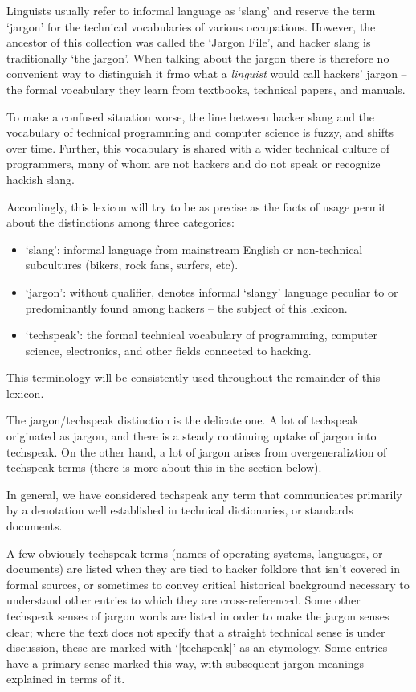 Linguists usually refer to informal language as `slang' and reserve the term
`jargon' for the technical vocabularies of various occupations. However, the
ancestor of this collection was called the `Jargon File', and hacker slang is
traditionally `the jargon'. When talking about the jargon there is therefore no
convenient way to distinguish it frmo what a \textit{linguist} would call
hackers' jargon -- the formal vocabulary they learn from textbooks, technical
papers, and manuals.

To make a confused situation worse, the line between hacker slang and the
vocabulary of technical programming and computer science is fuzzy, and shifts
over time. Further, this vocabulary is shared with a wider technical culture of
programmers, many of whom are not hackers and do not speak or recognize hackish
slang.

Accordingly, this lexicon will try to be as precise as the facts of usage permit
about the distinctions among three categories:

\begin{itemize}
	\item `slang': informal language from mainstream English or non-technical
		subcultures (bikers, rock fans, surfers, etc).
	\item `jargon': without qualifier, denotes informal `slangy' language
		peculiar to or predominantly found among hackers -- the subject of this
		lexicon.
	\item `techspeak': the formal technical vocabulary of programming, computer
		science, electronics, and other fields connected to hacking.
\end{itemize}

This terminology will be consistently used throughout the remainder of this
lexicon.

The jargon/techspeak distinction is the delicate one. A lot of techspeak
originated as jargon, and there is a steady continuing uptake of jargon into
techspeak. On the other hand, a lot of jargon arises from overgeneraliztion of
techspeak terms (there is more about this in the
 section below).

In general, we have considered techspeak any term that communicates primarily
by a denotation well established in technical dictionaries, or standards
documents.

A few obviously techspeak terms (names of operating systems, languages, or
documents) are listed when they are tied to hacker folklore that isn't covered
in formal sources, or sometimes to convey critical historical background
necessary to understand other entries to which they are cross-referenced. Some
other techspeak senses of jargon words are listed in order to make the jargon
senses clear; where the text does not specify that a straight technical sense
is under discussion, these are marked with `[techspeak]' as an etymology. Some
entries have a primary sense marked this way, with subsequent jargon meanings
explained in terms of it.

